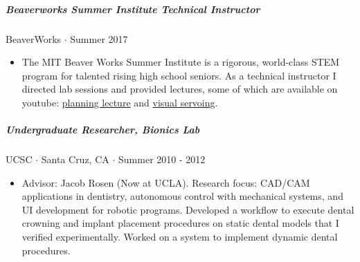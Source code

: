 \documentclass[10pt,letterpaper]{article}
\begin{document}
\subparagraph{Beaverworks Summer Institute Technical Instructor}
 BeaverWorks $\cdot$ Summer 2017
\begin{itemize}
    \item The MIT Beaver Works Summer Institute is a rigorous, world-class STEM program for talented rising high school seniors. As a technical instructor I directed lab sessions and provided lectures, some of which are available on youtube: \href{https://www.youtube.com/watch?v=CdRs0l9f5WM}{planning lecture}
        and \href{https://www.youtube.com/watch?v=bAAatB2IvUM}{visual servoing}.
\end{itemize}

\subparagraph{Undergraduate Researcher, Bionics Lab}
UCSC $\cdot$ Santa Cruz, CA $\cdot$ Summer 2010 - 2012
\begin{itemize}
    \item Advisor: Jacob Rosen (Now at UCLA).  Research focus: CAD/CAM applications in dentistry, autonomous control with mechanical systems, and UI development for robotic programs. Developed a workflow to execute dental crowning and implant placement procedures on static dental models that I verified experimentally. Worked on a system to implement dynamic dental procedures. 
\end{itemize}
\end{document}
